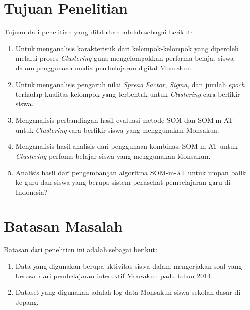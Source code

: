 \section{Tujuan Penelitian}
Tujuan dari penelitian yang dilakukan adalah sebagai berikut:

\begin{enumerate}
	\item Untuk menganalisis karakteristik dari kelompok-kelompok yang diperoleh melalui proses \textit{Clustering} guna mengelompokkan performa belajar siswa dalam penggunaan media pembelajaran digital Monsakun.
	
	\item Untuk menganalisis pengaruh nilai \textit{Spread Factor}, \textit{Sigma}, dan jumlah \textit{epoch}
	terhadap kualitas kelompok yang terbentuk untuk \textit{Clustering} cara berfikir siswa.
	
	\item Menganalisis perbandingan hasil evaluasi metode SOM dan SOM-m-AT untuk \textit{Clustering} cara berfikir siswa yang menggunakan Monsakun.
	
	\item Menganalisis hasil analisis dari penggunaan kombinasi SOM-m-AT untuk \textit{Clustering} perfoma belajar siswa yang menggunakan Monsakun.
	
	\item Analisis hasil dari pengembangan algoritma SOM-m-AT untuk umpan balik ke guru  dan siswa yang berupa sistem penasehat pembelajaran guru di Indonesia?
\end{enumerate}

\section{Batasan Masalah}
Batasan dari penelitian ini adalah sebagai berikut:

\begin{enumerate}
	\item Data yang digunakan berupa aktivitas siswa dalam mengerjakan soal yang berasal dari pembelajaran interaktif Monsakun pada tahun 2014.
	
	\item Dataset yang digunakan adalah log data Monsakun siswa sekolah dasar di Jepang. 
\end{enumerate}